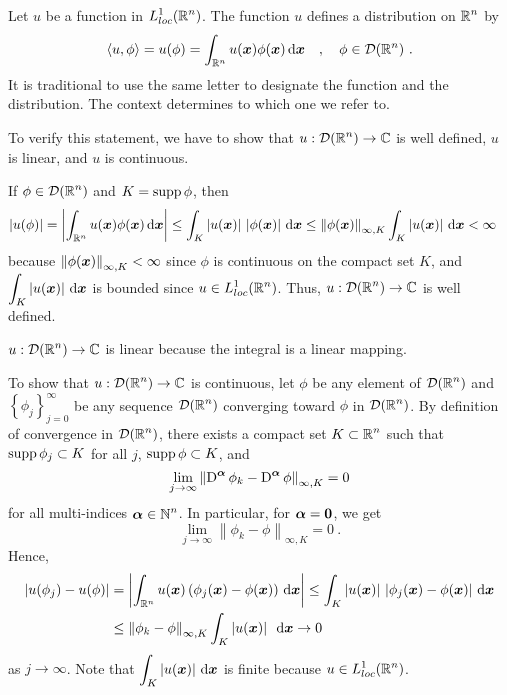 \begin{egg}
Let $u$ be a function in $\displaystyle L^1_{loc}(\mathbb{R}^n)$.  The
function $u$ defines a distribution on $\displaystyle \mathbb{R}^n$ by
\[
\left\langle{u} , {\phi}\right\rangle = u(\phi) =
\int_{\mathbb{R}^n} u({\bm{x}}) \phi({\bm{x}}) \,\mathrm{d}{{\bm{x}}} \quad ,
\quad \phi \in \mathcal{D}(\mathbb{R}^n) \ .
\]
It is traditional to use the same letter to designate the function
and the distribution.  The context determines to which one we refer to.

To verify this statement, we have to show that
$\displaystyle u:\mathcal{D}(\mathbb{R}^n)\rightarrow \mathbb{C}$ is well defined, $u$ is
linear, and $u$ is continuous.

If $\displaystyle \phi \in \mathcal{D}(\mathbb{R}^n)$ and $K = \operatorname{supp} \phi$, then 
\begin{align*}
\left|u(\phi)\right|
&= \left| \int_{\mathbb{R}^n} u({\bm{x}}) \phi({\bm{x}}) \,\mathrm{d}{{\bm{x}}} \right|
\leq \int_{K} \left|u({\bm{x}})\right|\,
\left| \phi({\bm{x}})\right| \,\mathrm{d}{{\bm{x}}}
\leq \left\|\phi({\bm{x}})\right\|_{\infty,K}
\int_{K} \left| u({\bm{x}})\right| \,\mathrm{d}{{\bm{x}}} <\infty
\end{align*}
because
$\displaystyle \left\|\phi({\bm{x}})\right\|_{\infty,K} < \infty$ since
$\phi$ is continuous on the compact set $K$, and
$\displaystyle \int_{K} \left| u({\bm{x}})\right| \,\mathrm{d}{{\bm{x}}}$ is bounded
since $\displaystyle u\in L^1_{loc}(\mathbb{R}^n)$.  Thus,
$\displaystyle u:\mathcal{D}(\mathbb{R}^n)\rightarrow \mathbb{C}$ is well defined.

$\displaystyle u:\mathcal{D}(\mathbb{R}^n)\rightarrow \mathbb{C}$ is linear because the integral is a
linear mapping.

To show that $\displaystyle u:\mathcal{D}(\mathbb{R}^n)\rightarrow \mathbb{C}$ is
continuous, let $\phi$ be any element of $\displaystyle \mathcal{D}(\mathbb{R}^n)$ and
$\displaystyle \left\{ \phi_j\right\}_{j=0}^\infty$ be any sequence
$\displaystyle \mathcal{D}(\mathbb{R}^n)$ converging toward $\phi$ in
$\displaystyle \mathcal{D}(\mathbb{R}^n)$.  By definition
of convergence in $\displaystyle \mathcal{D}(\mathbb{R}^n)$, there exists a compact set
$\displaystyle K \subset \mathbb{R}^n$ such that $\operatorname{supp} \phi_j \subset K$ for all $j$,
$\operatorname{supp} \phi \subset K$, and
\[
\lim_{j\rightarrow \infty}
\left\| \operatorname{D}^{{\bm{\alpha}}} \phi_k
- \operatorname{D}^{{\bm{\alpha}}} \phi \right\|_{\infty,K} = 0
\]
for all multi-indices $\displaystyle {\bm{\alpha}} \in \mathbb{N}^n$.
In particular, for ${\bm{\alpha}} = {\bm{0}}$, we get
\[
\lim_{j\rightarrow \infty} \left\| \phi_k - \phi \right\|_{\infty,K} = 0 \ .
\]
Hence,
\begin{align*}
\left|u(\phi_j) - u(\phi)\right| &=
\left| \int_{\mathbb{R}^n} u({\bm{x}})
\left(\phi_j({\bm{x}}) - \phi({\bm{x}})\right) \,\mathrm{d}{{\bm{x}}} \right|
\leq \int_K \left| u({\bm{x}}) \right|\,
\left|\phi_j({\bm{x}}) - \phi({\bm{x}})\right| \,\mathrm{d}{{\bm{x}}} \\
& \leq \left\| \phi_k - \phi \right\|_{\infty,K} 
\int_K \left| u({\bm{x}}) \right|\ \,\mathrm{d}{{\bm{x}}} \rightarrow 0
\end{align*}
as $j \to \infty$.  Note that
$\displaystyle \int_K \left| u({\bm{x}}) \right| \,\mathrm{d}{{\bm{x}}}$ is finite
because $\displaystyle u\in L^1_{loc}(\mathbb{R}^n)$.
\end{egg}

